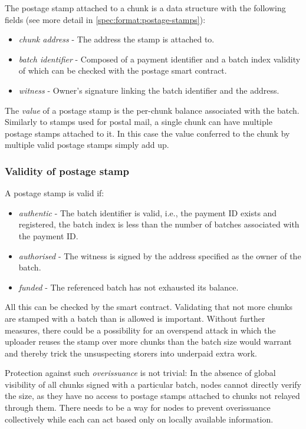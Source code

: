 The postage stamp attached to a chunk is a data structure with the following fields (see more detail in \ref{spec:format:postage-stamps}):

\begin{itemize}
    \item \emph{chunk address} - The address the stamp is attached to. 
    \item \emph{batch identifier} - Composed of a payment identifier and a batch index validity of which can be checked with the postage smart contract.
    \item \emph{witness} - Owner's signature linking the batch identifier and the address.
\end{itemize}

The \emph{value} of a postage stamp is the per-chunk balance associated with the batch.
Similarly to stamps used for postal mail, a single chunk can have multiple postage stamps attached to it. In this case the value conferred to the chunk by multiple valid postage stamps simply add up. 

\subsubsection{Validity of postage stamp}

A postage stamp is valid if:

\begin{itemize}
\item \emph{authentic} - The batch identifier is valid, i.e., the payment ID exists and registered, the batch index is less than the number of batches associated with the payment ID.
\item \emph{authorised} - The witness is signed by the address specified as the owner of the batch.
\item \emph{funded} - The referenced batch has not exhausted its balance. 
\end{itemize}

All this can be checked by the smart contract. 
Validating that not more chunks are stamped with a batch than is allowed is important. Without further measures, there could be a possibility for an overspend attack in which the uploader reuses the stamp over more chunks than the  batch size would warrant and thereby  trick the unsuspecting storers into underpaid extra work. 

Protection against such \emph{overissuance} is not trivial: In the absence of global visibility of all chunks signed with a particular batch, nodes cannot directly verify the size, as they have no access to postage stamps attached to chunks not relayed through them. There needs to be a way for nodes to prevent overissuance collectively while each can act based only on locally available information.

